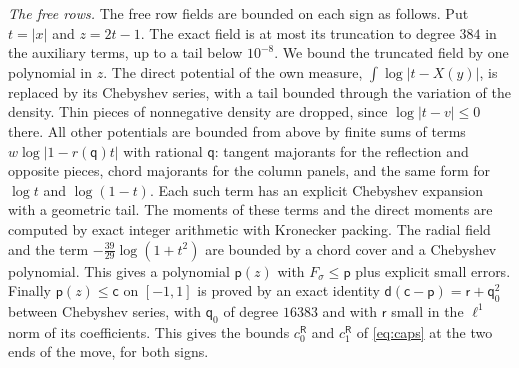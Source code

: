 \documentclass[11pt]{amsart}
\theoremstyle{definition}
\theoremstyle{remark}
\numberwithin{equation}{section}
\begin{document}
\emph{The free rows.} The free row fields are bounded on each sign as follows. Put $t=|x|$ and $z=2t-1$. The exact field is at most its truncation to degree $384$ in the auxiliary terms, up to a tail
below $10^{-8}$. We bound the truncated field by one polynomial in $z$. The direct potential of the own measure, $\int\log|t-X(y)|$, is replaced by its Chebyshev series,
with a tail bounded through the variation of the density. Thin pieces of nonnegative density are dropped, since $\log|t-v|\le0$ there. All other potentials
are bounded from above by finite sums of terms $w\log|1-r(\mathsf q)t|$ with rational $\mathsf q$: tangent majorants for the reflection and opposite pieces, chord majorants for the
column panels, and the same form for $\log t$ and $\log(1-t)$. Each such term has an explicit Chebyshev expansion with a geometric tail. The moments of these terms and the
direct moments are computed by exact integer arithmetic with Kronecker packing. The radial field and the term $-\frac{39}{29}\log(1+t^2)$ are bounded by a chord cover and a
Chebyshev polynomial. This gives a polynomial $\mathsf p(z)$ with $F_\sigma\le\mathsf p$ plus explicit small errors. Finally $\mathsf p(z)\le\mathsf c$ on $[-1,1]$ is proved by an exact identity
$\mathsf d(\mathsf c-\mathsf p)=\mathsf r+\mathsf q_0^2$ between Chebyshev series, with $\mathsf q_0$ of degree $16383$ and with $\mathsf r$ small in the $\ell^1$ norm of its coefficients. This gives
the bounds $c^{\mathsf R}_0$ and $c^{\mathsf R}_1$ of \eqref{eq:caps} at the two ends of the move, for both signs.
\end{document}

